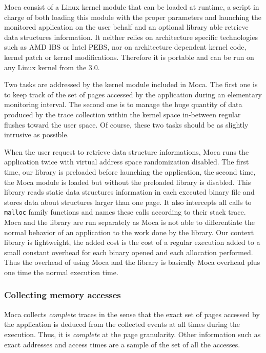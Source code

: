\gls{Moca} consist of a Linux kernel module that can be loaded at runtime,  a script in charge of both loading this module with the proper parameters and launching the monitored application on the user behalf and an optional library able retrieve data structures information.
It neither relies on architecture specific technologies such as \gls{AMD} \gls{IBS} or \gls{Intel} \gls{PEBS}, nor on architecture dependent kernel code, kernel patch or kernel modifications.
Therefore it is portable and can be run on any Linux kernel from the $3.0$.

Two tasks are addressed by the kernel module included in \gls{Moca}.
The first one is to keep track of the set of pages accessed by the application during an elementary monitoring interval.
The second one is to manage the huge quantity of data produced by the trace collection within the kernel space in-between regular flushes toward the user space.
Of course, these two tasks should be as slightly intrusive as possible.

When the user request to retrieve data structure informations, \gls{Moca} runs the application twice with virtual address space randomization disabled.
The first time, our library is preloaded before launching the application, the second time, the \gls{Moca} module is loaded but without the preloaded library is disabled.
This library reads static data structures information in each executed binary file and stores data about structures larger than one page.
It also intercepts all calls to \texttt{malloc} family functions and names these calls according to their stack trace.
\gls{Moca} and the library are run separately as \gls{Moca} is not able to differentiate the normal behavior of an application to the work done by the library.
Our context library is lightweight, the added cost is the cost of a regular execution added to a small constant overhead for each binary opened and each allocation performed.
Thus the overhead of using \gls{Moca} and the library is basically \gls{Moca} overhead plus one time the normal execution time.

\subsubsection{Collecting memory accesses}

\gls{Moca} collects \emph{complete} traces in the sense that the exact set of pages accessed by the application is deduced from the collected events at all times during the execution.
Thus, it is \emph{complete} at the page granularity.
Other information such as exact addresses and access times are a sample of the set of all the accesses.

